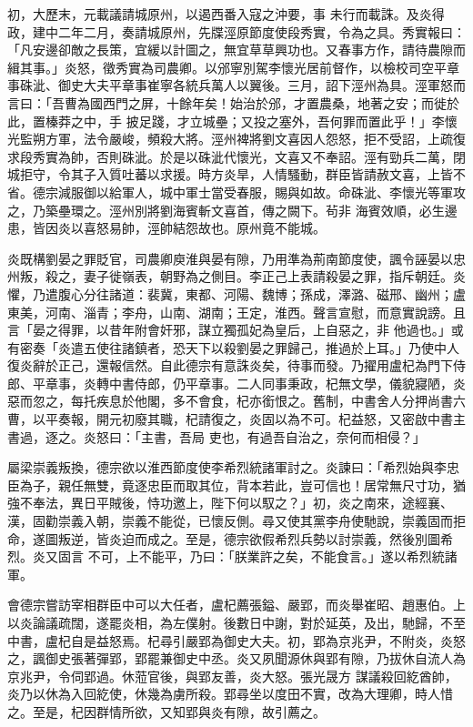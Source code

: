 \begin{pinyinscope}
 初，大歷末，元載議請城原州，以遏西番入寇之沖要，事
 未行而載誅。及炎得政，建中二年二月，奏請城原州，先牒涇原節度使段秀實，令為之具。秀實報曰：「凡安邊卻敵之長策，宜緩以計圖之，無宜草草興功也。又春事方作，請待農隙而緝其事。」炎怒，徵秀實為司農卿。以邠寧別駕李懷光居前督作，以檢校司空平章事硃泚、御史大夫平章事崔寧各統兵萬人以翼後。三月，詔下涇州為具。涇軍怒而言曰：「吾曹為國西門之屏，十餘年矣！始治於邠，才置農桑，地著之安；而徙於此，置榛莽之中，手
 披足踐，才立城壘；又投之塞外，吾何罪而置此乎！」李懷光監朔方軍，法令嚴峻，頻殺大將。涇州裨將劉文喜因人怨怒，拒不受詔，上疏復求段秀實為帥，否則硃泚。於是以硃泚代懷光，文喜又不奉詔。涇有勁兵二萬，閉城拒守，令其子入質吐蕃以求援。時方炎旱，人情騷動，群臣皆請赦文喜，上皆不省。德宗減服御以給軍人，城中軍士當受春服，賜與如故。命硃泚、李懷光等軍攻之，乃築壘環之。涇州別將劉海賓斬文喜首，傳之闕下。茍非
 海賓效順，必生邊患，皆因炎以喜怒易帥，涇帥結怨故也。原州竟不能城。



 炎既構劉晏之罪貶官，司農卿庾淮與晏有隙，乃用準為荊南節度使，諷令誣晏以忠州叛，殺之，妻子徙嶺表，朝野為之側目。李正己上表請殺晏之罪，指斥朝廷。炎懼，乃遣腹心分往諸道：裴冀，東都、河陽、魏博；孫成，澤潞、磁邢、幽州；盧東美，河南、淄青；李舟，山南、湖南；王定，淮西。聲言宣慰，而意實說謗。且言「晏之得罪，以昔年附會奸邪，謀立獨孤妃為皇后，上自惡之，非
 他過也。」或有密奏「炎遣五使往諸鎮者，恐天下以殺劉晏之罪歸己，推過於上耳。」乃使中人復炎辭於正己，還報信然。自此德宗有意誅炎矣，待事而發。乃擢用盧杞為門下侍郎、平章事，炎轉中書侍郎，仍平章事。二人同事秉政，杞無文學，儀貌寢陋，炎惡而忽之，每托疾息於他閣，多不會食，杞亦銜恨之。舊制，中書舍人分押尚書六曹，以平奏報，開元初廢其職，杞請復之，炎固以為不可。杞益怒，又密啟中書主書過，逐之。炎怒曰：「主書，吾局
 吏也，有過吾自治之，奈何而相侵？」



 屬梁崇義叛換，德宗欲以淮西節度使李希烈統諸軍討之。炎諫曰：「希烈始與李忠臣為子，親任無雙，竟逐忠臣而取其位，背本若此，豈可信也！居常無尺寸功，猶強不奉法，異日平賊後，恃功邀上，陛下何以馭之？」初，炎之南來，途經襄、漢，固勸崇義入朝，崇義不能從，已懷反側。尋又使其黨李舟使馳說，崇義固而拒命，遂圖叛逆，皆炎迫而成之。至是，德宗欲假希烈兵勢以討崇義，然後別圖希烈。炎又固言
 不可，上不能平，乃曰：「朕業許之矣，不能食言。」遂以希烈統諸軍。



 會德宗嘗訪宰相群臣中可以大任者，盧杞薦張鎰、嚴郢，而炎舉崔昭、趙惠伯。上以炎論議疏闊，遂罷炎相，為左僕射。後數日中謝，對於延英，及出，馳歸，不至中書，盧杞自是益怒焉。杞尋引嚴郢為御史大夫。初，郢為京兆尹，不附炎，炎怒之，諷御史張著彈郢，郢罷兼御史中丞。炎又夙聞源休與郢有隙，乃拔休自流人為京兆尹，令伺郢過。休蒞官後，與郢友善，炎大怒。張光晟方
 謀議殺回紇酋帥，炎乃以休為入回紇使，休幾為虜所殺。郢尋坐以度田不實，改為大理卿，時人惜之。至是，杞因群情所欲，又知郢與炎有隙，故引薦之。




\end{pinyinscope}
